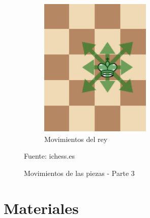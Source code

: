 \documentclass[conference]{IEEEtran}
\begin{document}
\begin{figure}[h!]
\begin{subfigure}[b]{0.45\linewidth}
    \includegraphics[width=\linewidth]{images/Capturep06.PNG}
    \caption{Movimientos del rey}
    \label{fig:reyM}
    \end{subfigure}
    \caption{Movimientos de las piezas - Parte 3}
    {{\footnotesize Fuente: ichess.es}}
    \label{fig:westminster}
    \end{figure}

\section{Materiales}
\end{document}
